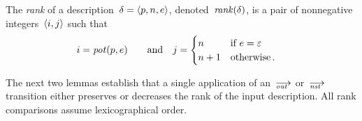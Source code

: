 
\begin{definition}
  \label{def.rank}
  The \emph{rank} of a description~$\delta=\<p,n,e>$,
  denoted~$\operatorname{\mathit{rank}}(\delta)$, is a pair of nonnegative integers~$\<i,j>$ such
  that
  \begin{alignat*}{2}
    i&=\operatorname{\mathit{pot}}(p,e) &\quad\text{and}\quad
    j&=
       \begin{cases}
         n  &\text{if~$e=\varepsilon$}\\
         n+1&\text{otherwise\,.}
       \end{cases}
  \end{alignat*}
\end{definition}

The next two lemmas establish that a single application of an~$\out$
or~$\nst$ transition either preserves or decreases the rank of the input
description.  All rank comparisons assume lexicographical order.

